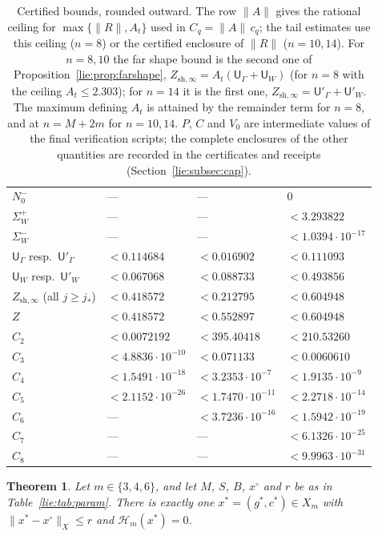 \documentclass[11pt]{amsart}
\newtheorem{theorem}{Theorem}[section]
\theoremstyle{definition}
\theoremstyle{remark}
\numberwithin{equation}{section}
\newcommand{\jst}{j_*}
\newcommand{\sU}{\mathsf{U}}
\newcommand{\nrm}[1]{\lVert #1\rVert}
\newcommand{\Hc}{\mathcal{H}}
\begin{document}
\begin{table}[tp]
\begin{tabular}{@{}llll@{}}
$N_0^-$ & --- & --- & $0$\\
$\Sigma_W^+$ & --- & --- & $<3.293822$\\
$\Sigma_W^-$ & --- & --- & $<1.0394\cdot10^{-17}$\\
$\sU_\Gamma$ resp.\ $\sU'_\Gamma$ & $<0.114684$ & $<0.016902$ & $<0.111093$\\
$\sU_W$ resp.\ $\sU'_W$ & $<0.067068$ & $<0.088733$ & $<0.493856$\\
$Z_{\mathrm{sh},\infty}$ (all $j\geq\jst$) & $<0.418572$ & $<0.212795$ & $<0.604948$\\
$Z$ & $<0.418572$ & $<0.552897$ & $<0.604948$\\
\midrule
$C_2$ & $<0.0072192$ & $<395.40418$ & $<210.53260$\\
$C_3$ & $<4.8836\cdot10^{-10}$ & $<0.071133$ & $<0.0060610$\\
$C_4$ & $<1.5491\cdot10^{-18}$ & $<3.2353\cdot10^{-7}$ & $<1.9135\cdot10^{-9}$\\
$C_5$ & $<2.1152\cdot10^{-26}$ & $<1.7470\cdot10^{-11}$ & $<2.2718\cdot10^{-14}$\\
$C_6$ & --- & $<3.7236\cdot10^{-16}$ & $<1.5942\cdot10^{-19}$\\
$C_7$ & --- & --- & $<6.1326\cdot10^{-25}$\\
$C_8$ & --- & --- & $<9.9963\cdot10^{-31}$\\
\bottomrule
\end{tabular}
\caption{Certified bounds, rounded outward. The row $\nrm A$ gives the rational ceiling for $\max\{\nrm R,A_t\}$ used in $C_q=\nrm A\,c_q$; the tail estimates use this ceiling ($n=8$) or the certified enclosure of $\nrm R$ ($n=10,14$). For $n=8,10$ the far shape bound is the second one of Proposition~\ref{lie:prop:farshape}, $Z_{\mathrm{sh},\infty}=A_t(\sU_\Gamma+\sU_W)$ (for $n=8$ with the ceiling $A_t\leq2.303$); for $n=14$ it is the first one, $Z_{\mathrm{sh},\infty}=\sU'_\Gamma+\sU'_W$. The maximum defining $A_t$ is attained by the remainder term for $n=8$, and at $n=M+2m$ for $n=10,14$. $P$, $C$ and $V_0$ are intermediate values of the final verification scripts; the complete enclosures of the other quantities are recorded in the certificates and receipts (Section~\ref{lie:subsec:cap}).}
\label{lie:tab:bounds}
\end{table}

\begin{theorem}\label{lie:thm:zero}
Let $m\in\{3,4,6\}$, and let $M$, $S$, $B$, $x^\circ$ and $r$ be as in Table~\ref{lie:tab:param}. There is exactly one $x^*=(g^*,c^*)\in X_m$ with $\nrm{x^*-x^\circ}_X\leq r$ and $\Hc_m(x^*)=0$.
\end{theorem}
\end{document}
